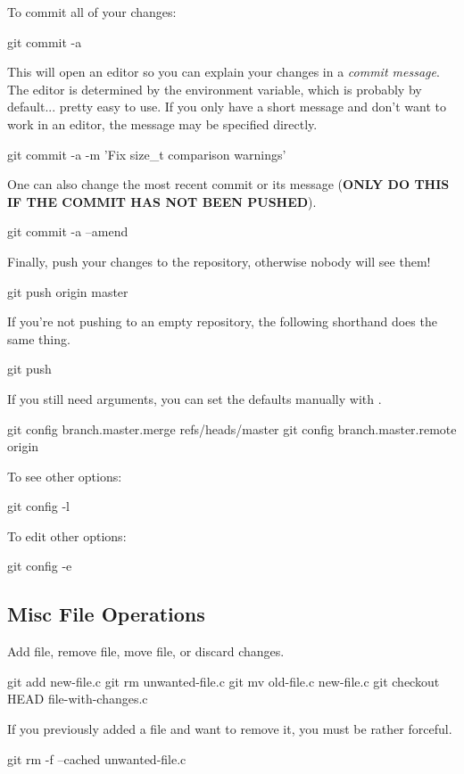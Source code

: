 To commit all of your changes:
\begin{code}
git commit -a
\end{code}
This will open an editor so you can explain your changes in a \textit{commit message}.
The editor is determined by the  environment variable, which is probably  by default... pretty easy to use.
If you only have a short message and don't want to work in an editor, the message may be specified directly.
\begin{code}
git commit -a -m 'Fix size_t comparison warnings'
\end{code}

One can also change the most recent commit or its message (\textbf{ONLY DO THIS IF THE COMMIT HAS NOT BEEN PUSHED}).
\begin{code}
git commit -a --amend
\end{code}

Finally, push your changes to the repository, otherwise nobody will see them!
\begin{code}
git push origin master
\end{code}
If you're not pushing to an empty repository, the following shorthand does the same thing.
\begin{code}
git push
\end{code}

If you still need arguments, you can set the defaults manually with .
\begin{code}
 git config branch.master.merge refs/heads/master
 git config branch.master.remote origin
\end{code}
To see other options:
\begin{code}
 git config -l
\end{code}
To edit other options:
\begin{code}
 git config -e
\end{code}

\subsection{Misc File Operations}
Add file, remove file, move file, or discard changes.
\begin{code}
git add new-file.c
git rm unwanted-file.c
git mv old-file.c new-file.c
git checkout HEAD file-with-changes.c
\end{code}

If you previously added a file and want to remove it, you must be rather forceful.
\begin{code}
git rm -f --cached unwanted-file.c
\end{code}

